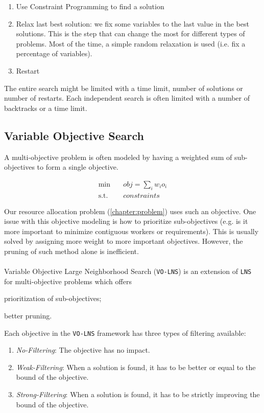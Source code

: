 \documentclass[../../thesis.tex]{subfiles}
\begin{document}
\begin{enumerate}
  \item Use Constraint Programming to find a solution 
  \item Relax last best solution: we fix some variables to the last value in the best solutions. This is the 
        step that can change the most for different types of problems. Most of the time, a simple random relaxation is used (i.e. fix a percentage of variables).
  \item Restart
\end{enumerate}

The entire search might be limited with a time limit, number of solutions or number of restarts. Each independent search 
is often limited with a number of backtracks or a time limit.

\subsection{Variable Objective Search}

A multi-objective problem is often modeled by having a weighted sum of sub-objectives to form a 
single objective. 

\begin{align*}
  \text{min} \quad & obj = \sum_{i} w_i o_i \\
  \text{s.t.} \quad & constraints
\end{align*}

Our resource allocation problem (\autoref{chapter:problem}) uses such an objective. One issue with this objective modeling is how 
to prioritize sub-objectives (e.g. is it more important to minimize contiguous workers or requirements). This is 
usually solved by assigning more weight to more important objectives. However, the pruning of such method alone is inefficient.

\paragraph{}

Variable Objective Large Neighborhood Search (\texttt{VO-LNS}) \cite{Schaus:VOLNS} is an extension of \texttt{LNS} for multi-objective 
problems which offers
\begin{enumerate*}[label=(\roman*)]
  \item prioritization of sub-objectives;
  \item better pruning.
\end{enumerate*}
Each objective in the \texttt{VO-LNS} framework has three types of filtering available:
\begin{enumerate}
  \item \emph{No-Filtering}: The objective has no impact.
  \item \emph{Weak-Filtering}: When a solution is found, it has to be better or equal to the bound of the objective. 
  \item \emph{Strong-Filtering}: When a solution is found, it has to be strictly improving the bound of the objective.
\end{enumerate}
\end{document}
